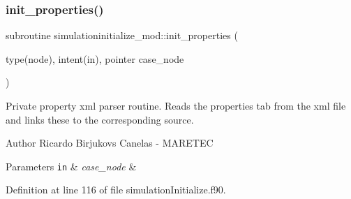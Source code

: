 \subsubsection{\texorpdfstring{init\+\_\+properties()}{init\_properties()}}
{\footnotesize\ttfamily subroutine simulationinitialize\+\_\+mod\+::init\+\_\+properties (\begin{DoxyParamCaption}\item[{type(node), intent(in), pointer}]{case\+\_\+node }\end{DoxyParamCaption})\hspace{0.3cm}{\ttfamily [private]}}



Private property xml parser routine. Reads the properties tab from the xml file and links these to the corresponding source. 

\begin{DoxyAuthor}{Author}
Ricardo Birjukovs Canelas -\/ M\+A\+R\+E\+T\+EC 
\end{DoxyAuthor}

\begin{DoxyParams}[1]{Parameters}
\mbox{\tt in}  & {\em case\+\_\+node} & \\
\hline
\end{DoxyParams}


Definition at line 116 of file simulation\+Initialize.\+f90.


